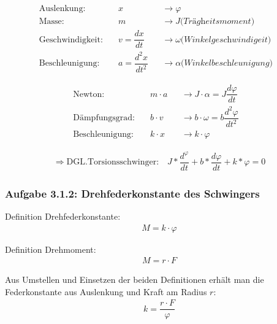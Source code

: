 \documentclass[a4paper]{scrartcl}
\numberwithin{equation}{subsection}
\begin{document}
\begin{align*}
\text{Auslenkung:}& \quad x 							&&\longrightarrow \varphi \\
\text{Masse:}& \quad m   							&&\longrightarrow J \textit{(Trägheitsmoment)} &\\
\text{Geschwindigkeit:}& \quad v=\dfrac{dx}{dt} 		&&\longrightarrow \omega \textit{(Winkelgeschwindigeit)}&\\
\text{Beschleunigung:}& \quad a=\dfrac{d^2x}{dt^2} 	&&\longrightarrow \alpha \textit{(Winkelbeschleunigung)}&
\end{align*}

\begin{align*}
\text{Newton:}& \quad m \cdot a  		&&\longrightarrow J \cdot \alpha = J \dfrac{d\varphi}{dt} &\\
\text{Dämpfungsgrad:}& \quad b \cdot v  	&&\longrightarrow b \cdot \omega = b \dfrac{d^2\varphi}{dt^2} &\\
\text{Beschleunigung:}& \quad k \cdot x 	&&\longrightarrow k \cdot \varphi &
\end{align*}

\begin{align}
\Rightarrow \text{DGL.Torsionsschwinger:} \quad J*\dfrac{d^\varphi}{dt} + b*\dfrac{d\varphi}{dt} + k*\varphi = 0
\end{align}

\subsubsection{Aufgabe 3.1.2: Drehfederkonstante des Schwingers}

Definition Drehfederkonstante:
\begin{align}
M = k \cdot \varphi
\end{align}

Definition Drehmoment:
\begin{align}
M = r \cdot F
\end{align}

Aus Umstellen und Einsetzen der beiden Definitionen erhält man die Federkonstante aus Auslenkung und Kraft am Radius $r$:
\begin{align}
k = \dfrac{r \cdot F}{\varphi}
\end{align}
\end{document}
